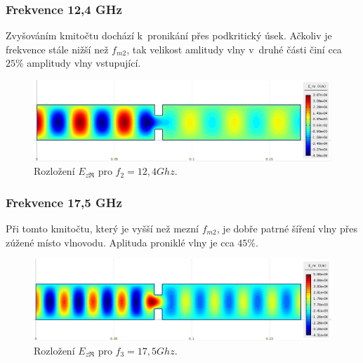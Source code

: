 \newpage
\subsubsection*{Frekvence 12,4 GHz}
Zvyšováním kmitočtu dochází k~pronikání přes podkritický úsek. Ačkoliv je frekvence stále nižší než $f_{m2}$, tak velikost amlitudy vlny v~druhé části činí cca $25 \%$ amplitudy vlny vstupující.
\begin{figure}[!h]
	\centering
	\includegraphics[width=15cm]{priklad_R100narrow_Ere_12Ghz.png}
	\caption{Rozložení $E_{z\Re}$ pro $f_2 = 12,4\unit{Ghz}$.}
	\label{obr:priklad_R100narrow_Ere_12Ghz}
\end{figure}

\subsubsection*{Frekvence 17,5 GHz}
Při tomto kmitočtu, který je vyšší než mezní $f_{m2}$, je dobře patrné šíření vlny přes zúžené místo vlnovodu. Aplituda proniklé vlny je cca $45 \%$.
\begin{figure}[!h]
	\centering
	\includegraphics[width=15cm]{priklad_R100narrow_Ere_17Ghz.png}
	\caption{Rozložení $E_{z\Re}$ pro $f_3 = 17,5\unit{Ghz}$.}
	\label{obr:priklad_R100narrow_Ere_17Ghz}
\end{figure}

\newpage

